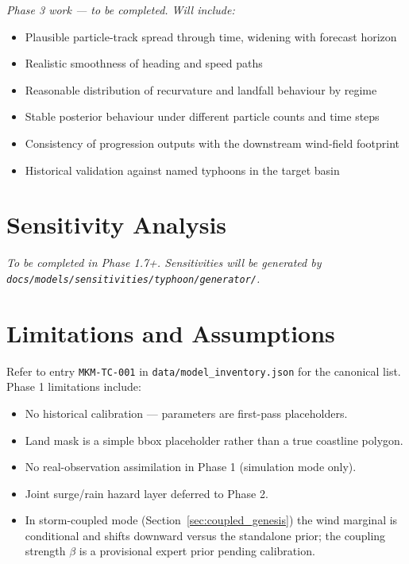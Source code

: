 \documentclass[11pt,a4paper]{article}
\begin{document}
\textit{Phase 3 work — to be completed. Will include:}

\begin{itemize}
  \item Plausible particle-track spread through time, widening with forecast horizon
  \item Realistic smoothness of heading and speed paths
  \item Reasonable distribution of recurvature and landfall behaviour by regime
  \item Stable posterior behaviour under different particle counts and time steps
  \item Consistency of progression outputs with the downstream wind-field footprint
  \item Historical validation against named typhoons in the target basin
\end{itemize}



\section{Sensitivity Analysis}

\textit{To be completed in Phase 1.7+. Sensitivities will be generated by
\texttt{docs/models/sensitivities/typhoon/generator/}.}

% 

\section{Limitations and Assumptions}

Refer to entry \texttt{MKM-TC-001} in \texttt{data/model\_inventory.json} for
the canonical list. Phase 1 limitations include:

\begin{itemize}
  \item No historical calibration — parameters are first-pass placeholders.
  \item Land mask is a simple bbox placeholder rather than a true coastline polygon.
  \item No real-observation assimilation in Phase 1 (simulation mode only).
  \item Joint surge/rain hazard layer deferred to Phase 2.
  \item In storm-coupled mode (Section~\ref{sec:coupled_genesis}) the wind
        marginal is conditional and shifts downward versus the standalone prior;
        the coupling strength $\beta$ is a provisional expert prior pending
        calibration.
\end{itemize}
\end{document}
